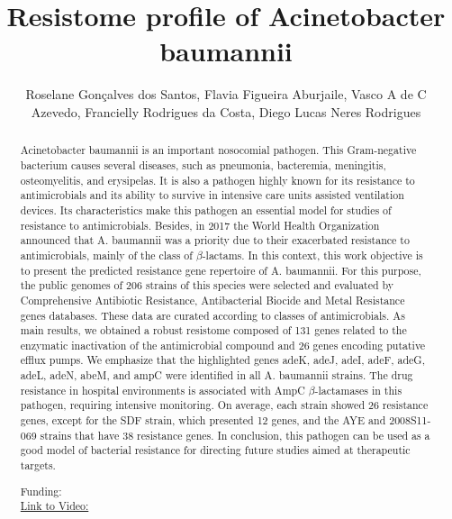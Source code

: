\documentclass[twoside]{article}
\title{\vspace{-15mm}\fontsize{24pt}{10pt}\selectfont\textbf{ Resistome profile of Acinetobacter baumannii }} %
\author{ Roselane Gon\c{c}alves dos Santos,  Flavia Figueira Aburjaile,  Vasco A de C Azevedo,  Francielly Rodrigues da Costa,  Diego Lucas Neres Rodrigues }
\affil{ INAPG- Fran\c{c}a,  IOC/Fiocruz,  UFMG,  UNIVERSIDADE FEDERAL DE MINAS GERAIS }
\date{}
\begin{document}
  
  
  \maketitle %
  
  
  \thispagestyle{fancy} %
  
  
  \begin{abstract}
  Acinetobacter baumannii is an important nosocomial pathogen. This Gram-negative bacterium causes several diseases,  such as pneumonia,  bacteremia,  meningitis,  osteomyelitis,  and erysipelas. It is also a pathogen highly known for its resistance to antimicrobials and its ability to survive in intensive care units assisted ventilation devices. Its characteristics make this pathogen an essential model for studies of resistance to antimicrobials. Besides,  in 2017 the World Health Organization announced that A. baumannii was a priority due to their exacerbated resistance to antimicrobials,  mainly of the class of $\beta$-lactams. In this context,  this work objective is to present the predicted resistance gene repertoire of A. baumannii. For this purpose,  the public genomes of 206 strains of this species were selected and evaluated by Comprehensive Antibiotic Resistance,  Antibacterial Biocide and Metal Resistance genes databases. These data are curated according to classes of antimicrobials. As main results,  we obtained a robust resistome composed of 131 genes related to the enzymatic inactivation of the antimicrobial compound and 26 genes encoding putative efflux pumps. We emphasize that the highlighted genes adeK,  adeJ,  adeI,  adeF,  adeG,  adeL,  adeN,  abeM,  and ampC were identified in all A. baumannii strains. The drug resistance in hospital environments is associated with AmpC $\beta$-lactamases in this pathogen,  requiring intensive monitoring. On average,  each strain showed 26 resistance genes,  except for the SDF strain,  which presented 12 genes,  and the AYE and 2008S11-069 strains that have 38 resistance genes. In conclusion,  this pathogen can be used as a good model of bacterial resistance for directing future studies aimed at therapeutic targets.
  
  Funding:   \\
  \href{http://ab3c.org.br/xpress_pres2020/xmxp2020-297728.html}{Link to Video:}

  \end{abstract}
   
  
\end{document}
